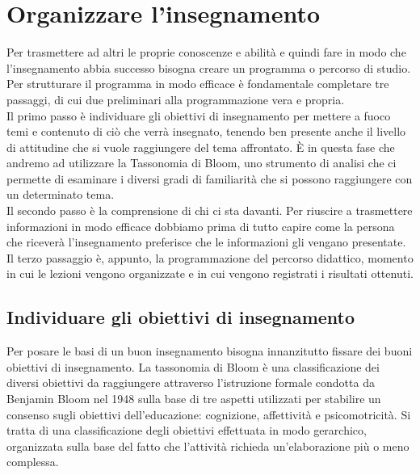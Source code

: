\chapter{Organizzare l'insegnamento}
\label{cha:intro}
Per trasmettere ad altri le proprie conoscenze e abilità e quindi fare in modo che l'insegnamento abbia successo bisogna creare un programma o percorso di studio. Per strutturare il programma in modo efficace è fondamentale completare tre passaggi, di cui due preliminari alla programmazione vera e propria.\\
Il primo passo è individuare gli obiettivi di insegnamento per mettere a fuoco temi e contenuto di ciò che verrà insegnato, tenendo ben presente anche il livello di attitudine che si vuole raggiungere del tema affrontato. È in questa fase che andremo ad utilizzare la Tassonomia di Bloom, uno strumento di analisi che ci permette di esaminare i diversi gradi di familiarità che si possono raggiungere con un determinato tema.\\
Il secondo passo è la comprensione di chi ci sta davanti. Per riuscire a trasmettere informazioni in modo efficace dobbiamo prima di tutto capire come la persona che riceverà l'insegnamento preferisce che le informazioni gli vengano presentate.\\
Il terzo passaggio è, appunto, la programmazione del percorso didattico, momento in cui le lezioni vengono organizzate e in cui vengono registrati i risultati ottenuti.
\section{Individuare gli obiettivi di insegnamento}
\label{sec:context}
Per posare le basi di un buon insegnamento bisogna innanzitutto fissare dei buoni obiettivi di insegnamento.
La tassonomia di Bloom è una classificazione dei diversi obiettivi da raggiungere attraverso l'istruzione formale condotta da Benjamin Bloom nel 1948 sulla base di tre aspetti utilizzati per stabilire un consenso sugli obiettivi dell'educazione: cognizione, affettività e psicomotricità. Si tratta di una classificazione degli obiettivi effettuata in modo gerarchico, organizzata sulla base del fatto che l'attività richieda un'elaborazione più o meno complessa.


